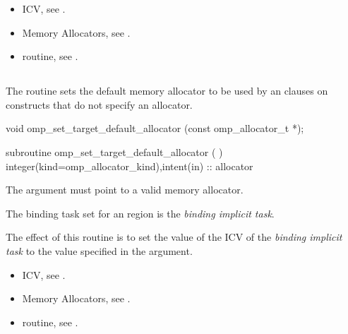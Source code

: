 \crossreferences
\begin{itemize}
\item {} ICV, see .
\item Memory Allocators, see .
\item {} routine, see .
\end{itemize}

\ccppspecificstart

\subsection{}
\label{subsec:omp_set_target_default_allocator}

\summary
The  routine sets the default memory allocator to be used by an  clauses on  constructs that do not specify an allocator.

\format
\ccppspecificstart
\begin{boxedcode}
void omp_set_target_default_allocator (const omp_allocator_t *);
\end{boxedcode}
\ccppspecificend
\fortranspecificstart
\begin{boxedcode}
subroutine omp_set_target_default_allocator (  )
integer(kind=omp_allocator_kind),intent(in) :: allocator
\end{boxedcode}
\fortranspecificend

\constraints

The  argument must point to a valid memory allocator.

\binding
The binding task set for an  region is the \emph{binding implicit task}.

\effect

The effect of this routine is to set the value of the  ICV of the \emph{binding implicit task} to the value specified in the  argument. 

\crossreferences

\begin{itemize}
\item {} ICV, see .
\item Memory Allocators, see .
\item {} routine, see .
\end{itemize}

